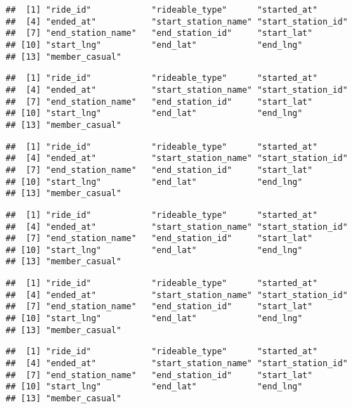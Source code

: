 \documentclass[
]{article}
\begin{document}
\begin{verbatim}
##  [1] "ride_id"            "rideable_type"      "started_at"        
##  [4] "ended_at"           "start_station_name" "start_station_id"  
##  [7] "end_station_name"   "end_station_id"     "start_lat"         
## [10] "start_lng"          "end_lat"            "end_lng"           
## [13] "member_casual"
\end{verbatim}

\begin{verbatim}
##  [1] "ride_id"            "rideable_type"      "started_at"        
##  [4] "ended_at"           "start_station_name" "start_station_id"  
##  [7] "end_station_name"   "end_station_id"     "start_lat"         
## [10] "start_lng"          "end_lat"            "end_lng"           
## [13] "member_casual"
\end{verbatim}

\begin{verbatim}
##  [1] "ride_id"            "rideable_type"      "started_at"        
##  [4] "ended_at"           "start_station_name" "start_station_id"  
##  [7] "end_station_name"   "end_station_id"     "start_lat"         
## [10] "start_lng"          "end_lat"            "end_lng"           
## [13] "member_casual"
\end{verbatim}

\begin{verbatim}
##  [1] "ride_id"            "rideable_type"      "started_at"        
##  [4] "ended_at"           "start_station_name" "start_station_id"  
##  [7] "end_station_name"   "end_station_id"     "start_lat"         
## [10] "start_lng"          "end_lat"            "end_lng"           
## [13] "member_casual"
\end{verbatim}

\begin{verbatim}
##  [1] "ride_id"            "rideable_type"      "started_at"        
##  [4] "ended_at"           "start_station_name" "start_station_id"  
##  [7] "end_station_name"   "end_station_id"     "start_lat"         
## [10] "start_lng"          "end_lat"            "end_lng"           
## [13] "member_casual"
\end{verbatim}

\begin{verbatim}
##  [1] "ride_id"            "rideable_type"      "started_at"        
##  [4] "ended_at"           "start_station_name" "start_station_id"  
##  [7] "end_station_name"   "end_station_id"     "start_lat"         
## [10] "start_lng"          "end_lat"            "end_lng"           
## [13] "member_casual"
\end{verbatim}
\end{document}
